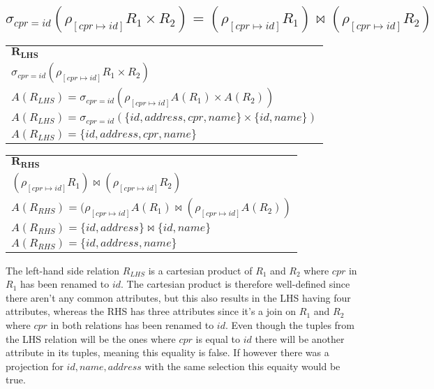 \subsection{\normalsize{$\sigma_{cpr=id}(\rho_{[cpr \mapsto id]}R_1 \times R_2) = (\rho_{[cpr \mapsto id]}R_1) \Join (\rho_{[cpr \mapsto id]}R_2)$}}

\begin{table}[ht]
	\begin{tabular}{l}
		 $\bm{R_{LHS}}$ \\
		 $\sigma_{cpr=id}(\rho_{[cpr \mapsto id]}R_1 \times R_2)$ \\
		 $A(R_{LHS}) = \sigma_{cpr=id}(\rho_{[cpr \mapsto id]}A(R_1) \times A(R_2))$ \\
		 $A(R_{LHS}) = \sigma_{cpr=id}(\{id, address, cpr, name\} \times \{id, name\})$ \\
		 $A(R_{LHS}) = \{id, address, cpr, name\}$
	\end{tabular}
\end{table}

\begin{table}[ht]
	\begin{tabular}{l}
		 $\bm{R_{RHS}}$ \\
		 $(\rho_{[cpr \mapsto id]}R_1) \Join (\rho_{[cpr \mapsto id]}R_2)$ \\
		 $A(R_{RHS}) = (\rho_{[cpr \mapsto id]}A(R_1) \Join (\rho_{[cpr \mapsto id]}A(R_2))$ \\
		 $A(R_{RHS}) = \{id, address\} \Join \{id, name\}$ \\
		 $A(R_{RHS}) = \{id, address, name\}$
	\end{tabular}
\end{table}
\FloatBarrier

The left-hand side relation $R_{LHS}$ is a cartesian product of $R_1$ and $R_2$ where $cpr$ in $R_1$ has been renamed to $id$.
The cartesian product is therefore well-defined since there aren't any common attributes, but this also results in the LHS having four attributes, whereas the RHS has three attributes since it's a join on $R_1$ and $R_2$ where $cpr$ in both relations has been renamed to $id$. Even though the tuples from the LHS relation will be the ones where $cpr$ is equal to $id$ there will be another attribute in its tuples, meaning this equality is false.
If however there was a projection for $id, name, address$ with the same selection this equaity would be true.\\\\

